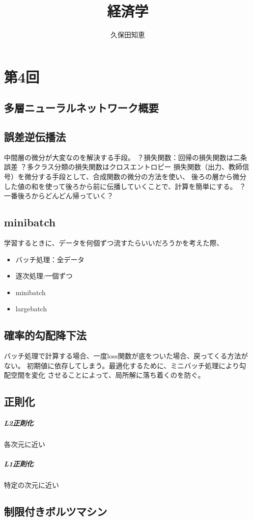 \documentclass{jsarticle}
\begin{document}
\title{経済学}
\author{久保田知恵}
\maketitle

\section{第4回}
\subsection{多層ニューラルネットワーク概要}
\subsection{誤差逆伝播法}
中間層の微分が大変なのを解決する手段。
？損失関数：回帰の損失関数は二条誤差
？多クラス分類の損失関数はクロスエントロピー
損失関数（出力、教師信号）を微分する手段として、合成関数の微分の方法を使い、
後ろの層から微分した値の和を使って後ろから前に伝播していくことで、計算を簡単にする。
？一番後ろからどんどん帰っていく？
\subsection{minibatch}
学習するときに、データを何個ずつ流すたらいいだろうかを考えた際、
\begin{itemize}
  \item バッチ処理：全データ
  \item 逐次処理:一個ずつ
  \item minibatch
  \item largebatch

\end{itemize}
\subsection{確率的勾配降下法}
バッチ処理で計算する場合、一度loss関数が底をついた場合、戻ってくる方法がない。
初期値に依存してしまう。最適化するために、ミニバッチ処理により勾配空間を変化
させることによって、局所解に落ち着くのを防ぐ。

\subsection{正則化}
\subparagraph{L2正則化}
各次元に近い
\subparagraph{L1正則化}
特定の次元に近い

\subsection{制限付きボルツマシン}
\end{document}
